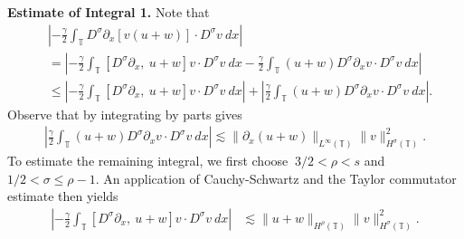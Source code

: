 \documentclass{beamer}
\newcommand{\p}{\partial}
\newcommand{\ci}{\mathbb{T}}
\begin{document}
\begin{frame}

{\bf Estimate of Integral 1.} Note that
%
%
\begin{equation*}
\begin{split}
& \left |  -\frac{\gamma}{2} \int_{\ci} D^\sigma \p_x [v(u+w)] \cdot
D^\sigma v \ dx \right |
\\
& =
\left |
-\frac{\gamma}{2} \int_{\ci} \left[ D^\sigma \p_x, \ u+w \right]v \cdot
D^\sigma v \ dx - \frac{\gamma}{2} \int_{\ci} (u+w) D^\sigma
\p_x v \cdot D^\sigma v\ dx
\right | \\
& \le \left |
-\frac{\gamma}{2} \int_{\ci} \left[ D^\sigma \p_x, \ u+w \right]v \cdot
D^\sigma v \ dx \right |
+ \left | \frac{\gamma}{2} \int_{\ci} (u+w) D^\sigma \p_x v
\cdot D^\sigma v\
dx \right |.
\label{4v}
\end{split}
\end{equation*}
%
%
Observe that by integrating by parts gives
%
%
\begin{equation*}
\begin{split}
\left | \frac{\gamma}{2}\int_{\ci} (u+w) D^\sigma \p_x v \cdot
D^\sigma v \ dx \right |
\lesssim \|\p_x (u+w)\|_{L^\infty(\ci)}
\|v\|_{H^\sigma(\ci)}^2.
\label{4'v}
\end{split}
\end{equation*}
%
%
%
%
To estimate the remaining integral, we first 
choose $\ 3/2 < \rho
< s$ and $ 1/2 < \sigma \le \rho -1$. An application of 
Cauchy-Schwartz and the Taylor commutator estimate then yields 
%
%
\begin{equation*}
\begin{split}
 \left | -\frac{\gamma}{2} \int_{\ci} [D^\sigma \p_x, \ u+w] v
\cdot D^\sigma v \ dx \right |
& \lesssim \|u+w\|_{H^\rho(\ci)} 
\|v\|_{H^\sigma(\ci)}^2.
\label{7v}
\end{split}
\end{equation*}
%
%
\end{frame}
\end{document}
